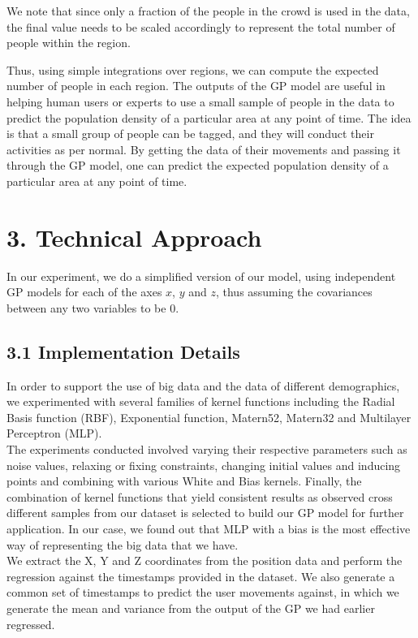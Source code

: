 \documentclass[letterpaper]{article}
\begin{document}
We note that since only a fraction of the people in the crowd is used in the data, the final value needs to be scaled accordingly to represent the total number of people within the region.

Thus, using simple integrations over regions, we can compute the expected number of people in each region. The outputs of the GP model are useful in helping human users or experts to use a small sample of people in the data to predict the population density of a particular area at any point of time. The idea is that a small group of people can be tagged, and they will conduct their activities as per normal. By getting the data of their movements and passing it through the GP model, one can predict the expected population density of a particular area at any point of time.

\section{3.  Technical Approach}

In our experiment, we do a simplified version of our model, using independent GP models for each of the axes $x$, $y$ and $z$, thus assuming the covariances between any two variables to be $0$. 

\subsection{3.1  Implementation Details}

In order to support the use of big data and the data of different demographics, we experimented with several families of kernel functions including the Radial Basis function (RBF), Exponential function, Matern52, Matern32 and Multilayer Perceptron (MLP).\\

The experiments conducted involved varying their respective parameters such as noise values, relaxing or fixing constraints, changing initial values and inducing points and combining with various White and Bias kernels. Finally, the combination of kernel functions that yield consistent results as observed cross different samples from our dataset is selected to build our GP model for further application. In our case, we found out that MLP with a bias is the most effective way of representing the big data that we have.\\

We extract the X, Y and Z coordinates from the position data and perform the regression against the timestamps provided in the dataset. We also generate a common set of timestamps to predict the user movements against, in which we generate the mean and variance from the output of the GP we had earlier regressed. \\
\end{document}
